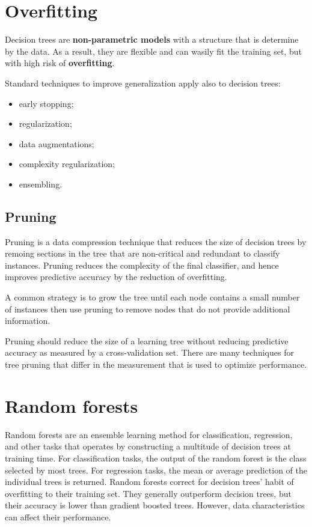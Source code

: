 \section{Overfitting}
Decision trees are \textbf{non-parametric models} with a structure that is determine by the data. As a result, they are flexible and can wasily fit the training set, but with high risk of \textbf{overfitting}. 

Standard techniques to improve generalization apply also to decision trees:
\begin{itemize}
    \item early stopping;
    \item regularization;
    \item data augmentations;
    \item complexity regularization;
    \item ensembling.
\end{itemize}

\subsection{Pruning}
Pruning is a data compression technique that reduces the size of decision trees by remoing sections in the tree that are non-critical and redundant to classify instances. Pruning reduces the complexity of the final classifier, and hence improves predictive accuracy by the reduction of overfitting.

A common strategy is to grow the tree until each node contains a small number of instances then use pruning to remove nodes that do not provide additional information.

Pruning should reduce the size of a learning tree without reducing predictive accuracy as measured by a cross-validation set. There are many techniques for tree pruning that differ in the measurement that is used to optimize performance.

\section{Random forests}
Random forests are an ensemble learning method for classification, regression, and other tasks that operates by constructing a multitude of decision trees at training time. For classification tasks, the output of the random forest is the class selected by most trees. For regression tasks, the mean or average prediction of the individual trees is returned. Random forests correct for decision trees' habit of overfitting to their training set. They generally outperform decision trees, but their accuracy is lower than gradient boosted trees. However, data characteristics can affect their performance. 

